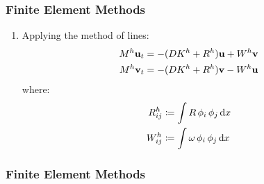 \begin{frame}
\frametitle{Finite Element Methods}
\begin{enumerate}
    \item Applying the method of lines:%
    \begin{align*}
        M^h \mathbf{u}_t &= -(D K^h + R^h) \mathbf{u} + W^h \mathbf{v} \\
        M^h \mathbf{v}_t &= -(D K^h + R^h) \mathbf{v} - W^h \mathbf{u}
    \end{align*}
    where:%
    \begin{align*}
        R^h_{ij} &\coloneqq \int R \,\phi_i \,\phi_j \operatorname{d}\!{x} \\
        W^h_{ij} &\coloneqq \int \omega \,\phi_i \,\phi_j \operatorname{d}\!{x}
    \end{align*}
\end{enumerate}
\end{frame}
\frametitle{Finite Element Methods}
